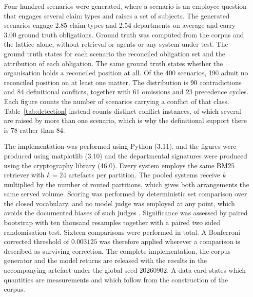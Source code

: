 \documentclass[journal]{IEEEtran}
\begin{document}
Four hundred scenarios were generated, where a scenario is an employee question that engages several claim types and raises a set of subjects. The generated scenarios engage 2.85 claim types and 2.54 departments on average and carry 3.00 ground truth obligations. Ground truth was computed from the corpus and the lattice alone, without retrieval or agents or any system under test. The ground truth states for each scenario the reconciled obligation set and the attribution of each obligation. The same ground truth states whether the organisation holds a reconciled position at all. Of the 400 scenarios, 190 admit no reconciled position on at least one matter. The distribution is 90 contradictions and 84 definitional conflicts, together with 61 omissions and 23 precedence cycles. Each figure counts the number of scenarios carrying a conflict of that class. Table~\ref{tab:detection} instead counts distinct conflict instances, of which several are raised by more than one scenario, which is why the definitional support there is 78 rather than 84.

The implementation was performed using Python (3.11), and the figures were produced using matplotlib (3.10) and the departmental signatures were produced using the cryptography library (46.0). Every system employs the same BM25 retriever with $k=24$ artefacts per partition. The pooled systems receive $k$ multiplied by the number of routed partitions, which gives both arrangements the same served volume. Scoring was performed by deterministic set comparison over the closed vocabulary, and no model judge was employed at any point, which avoids the documented biases of such judges \cite{wang2024unfair}. Significance was assessed by paired bootstrap with ten thousand resamples together with a paired two sided randomisation test. Sixteen comparisons were performed in total. A Bonferroni corrected threshold of $0.003125$ was therefore applied wherever a comparison is described as surviving correction. The complete implementation, the corpus generator and the model returns are released with the results in the accompanying artefact under the global seed 20260902. A data card states which quantities are measurements and which follow from the construction of the corpus.
\end{document}
